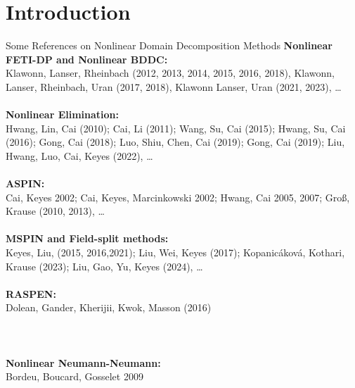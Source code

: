\section{Introduction}

\begin{frame}{Some References on Nonlinear Domain Decomposition Methods}
	\tiny
	\textbf{Nonlinear FETI-DP and Nonlinear BDDC:}\\
	Klawonn, Lanser, Rheinbach (2012, 2013, 2014, 2015, 2016, 2018), Klawonn, Lanser, Rheinbach, Uran (2017, 2018), Klawonn Lanser, Uran (2021, 2023), \dots\\~\\

	\textbf{Nonlinear Elimination:}\\
	Hwang, Lin, Cai (2010); Cai, Li (2011); Wang, Su, Cai (2015); Hwang, Su, Cai (2016); Gong, Cai (2018); Luo, Shiu, Chen, Cai (2019); Gong, Cai (2019); Liu, Hwang, Luo, Cai, Keyes (2022), \dots\\~\\

	\textbf{ASPIN:}\\
	Cai, Keyes 2002; Cai, Keyes, Marcinkowski 2002; Hwang, Cai 2005, 2007; Groß, Krause (2010, 2013), \dots\\~\\

	\textbf{MSPIN and Field-split methods:}\\
	Keyes, Liu, (2015, 2016,2021); Liu, Wei, Keyes (2017); Kopanicáková, Kothari, Krause (2023); Liu, Gao, Yu, Keyes (2024), \dots\\~\\

	\textbf{RASPEN:}\\
	Dolean, Gander, Kherijii, Kwok, Masson (2016)\\~\\


	\hspace*{-2.7mm}
	\noindent{}\\~\\

	\textbf{Nonlinear Neumann-Neumann:}\\ Bordeu, Boucard, Gosselet 2009\\~\\


\end{frame}
